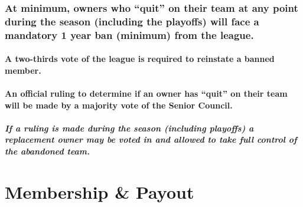 \documentclass[]{book}
\let\oldparagraph\paragraph
\renewcommand{\paragraph}[1]{\oldparagraph{#1}\mbox{}}
\begin{document}
\hypertarget{at-minimum-owners-who-quit-on-their-team-at-any-point-during-the-season-including-the-playoffs-will-face-a-mandatory-1-year-ban-minimum-from-the-league.}{%
\subsection{At minimum, owners who ``quit'' on their team at any point during the season (including the playoffs) will face a mandatory 1 year ban (minimum) from the league.}\label{at-minimum-owners-who-quit-on-their-team-at-any-point-during-the-season-including-the-playoffs-will-face-a-mandatory-1-year-ban-minimum-from-the-league.}}

\hypertarget{a-two-thirds-vote-of-the-league-is-required-to-reinstate-a-banned-member.}{%
\subsubsection{A two-thirds vote of the league is required to reinstate a banned member.}\label{a-two-thirds-vote-of-the-league-is-required-to-reinstate-a-banned-member.}}

\hypertarget{an-official-ruling-to-determine-if-an-owner-has-quit-on-their-team-will-be-made-by-a-majority-vote-of-the-senior-council.}{%
\subsubsection{An official ruling to determine if an owner has ``quit'' on their team will be made by a majority vote of the Senior Council.}\label{an-official-ruling-to-determine-if-an-owner-has-quit-on-their-team-will-be-made-by-a-majority-vote-of-the-senior-council.}}

\hypertarget{if-a-ruling-is-made-during-the-season-including-playoffs-a-replacement-owner-may-be-voted-in-and-allowed-to-take-full-control-of-the-abandoned-team.}{%
\paragraph{If a ruling is made during the season (including playoffs) a replacement owner may be voted in and allowed to take full control of the abandoned team.}\label{if-a-ruling-is-made-during-the-season-including-playoffs-a-replacement-owner-may-be-voted-in-and-allowed-to-take-full-control-of-the-abandoned-team.}}

\hypertarget{membership-payout}{%
\chapter{Membership \& Payout}\label{membership-payout}}
\end{document}
